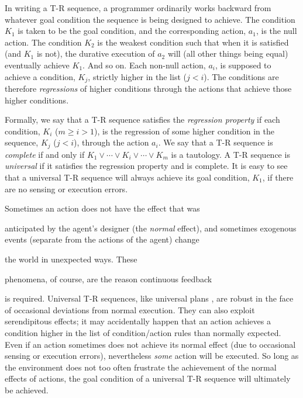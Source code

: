 In writing a T-R sequence, a programmer ordinarily works backward from  
whatever goal condition the sequence is being designed to achieve. The  
condition $K_1$ is taken to be the goal condition, and the corresponding  
action, $a_1$, is the null action.  The condition $K_2$ is the weakest  
condition such that when it is satisfied (and $K_1$ is not), the durative  
execution of $a_2$ will (all other things being equal) eventually achieve  
$K_1$.  And so on.   Each non-null action, $a_i$, is supposed to achieve a  
condition,  $K_j$, strictly higher in the list ($j < i$).  The conditions are  
therefore {\it regressions} \cite{Nilssonbook} of higher conditions through  
the actions that achieve those higher conditions.  


Formally, we say that a T-R sequence satisfies the {\it regression property}  
if each condition, $K_i$ ($m \geq i > 1$), is the regression of some higher  
condition in the sequence, $K_j$ ($j < i$), through the action $a_i$.  We say  
that a T-R sequence is {\it complete} if and only if $K_1 \vee \cdots \vee  
K_i \vee \cdots \vee K_m$ is a tautology.  A T-R sequence is {\it universal}  
if it satisfies the regression property and is complete. It is easy to see  
that a universal T-R sequence will always achieve its goal condition, $K_1$,  
if there are no sensing or execution errors.


Sometimes an action does not have the effect that was 

anticipated by the agent's designer (the {\it normal} effect), and sometimes  
exogenous events (separate from the actions of the agent) change 

the world in unexpected  ways.  These 

phenomena, of course, are the reason continuous feedback 

is required.  Universal T-R sequences, like universal plans \cite{Schoppers},   
are robust in the face of occasional deviations from normal execution. They  
can also exploit serendipitous effects;  it may accidentally happen that an  
action achieves a condition higher in the list of condition/action rules than  
normally expected.  Even if an action sometimes does not achieve its normal  
effect (due to occasional sensing or execution errors), nevertheless {\it  
some} action will be executed.  So long as the environment does not too often  
frustrate the achievement of the normal effects of actions, the goal  
condition of a universal T-R sequence will ultimately be achieved.   


